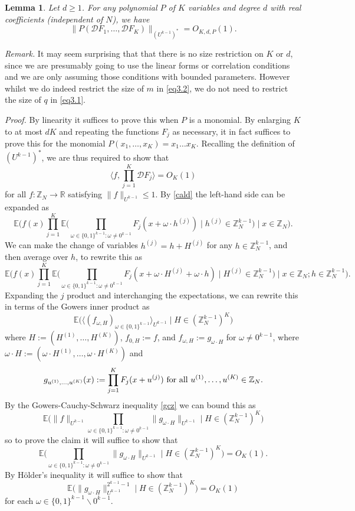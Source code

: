 \documentclass[12pt,a4paper,reqno]{amsart}
\numberwithin{equation}{section}
\theoremstyle{plain}
\newtheorem{lemma}[subsection]{Lemma}
\theoremstyle{definition}
\renewcommand{\leq}{\leqslant}
\renewcommand{\geq}{\geqslant}
\def\E{{\mathbb E}}
\def\R{{\mathbb R}}
\def\vs{\vspace{11pt}}
\def\proof{\noindent\textit{Proof. }}
\begin{document}
\begin{lemma}\label{poly-lemma} Let $d \geq 1$.  For any polynomial $P$ of $K$ variables and degree $d$ with real coefficients \textup{(}independent of $N$\textup{)}, we have
\[ \| P({\mathcal D} F_1, \ldots, {\mathcal D} F_K) \|_{(U^{k-1})^*} = O_{K,d,P}(1).\]
\end{lemma}

\noindent\textit{Remark.} It may seem surprising that that there is no size restriction on $K$ or $d$, since we are presumably going to use the linear forms or correlation conditions and we are only assuming those conditions with bounded parameters.  However whilst we do indeed restrict the size of $m$ in \eqref{eq3.2}, we do not need to restrict the size of $q$ in \eqref{eq3.1}.\vs

\proof  By linearity it suffices to prove this when $P$ is a monomial.
By enlarging $K$ to at most $dK$ and repeating the functions $F_j$ as necessary, it in fact suffices to prove this for the monomial $P(x_1,\ldots,x_K) = x_1 \ldots x_K$.
Recalling the definition of $(U^{k-1})^*$, we are thus required to show that
\[ \big\langle f, \prod_{j=1}^K {\mathcal D} F_j \big\rangle = O_K(1) \]
for all $f: \mathbb{Z}_N \to \R$ satisfying $\| f \|_{U^{k-1}} \leq 1$.  
By \eqref{cald} the left-hand side can be expanded as
\[
\E\bigg( f(x)
\prod_{j=1}^K \E\big( \prod_{\omega \in \{0,1\}^{k-1}: \omega \neq 0^{k-1}} F_j(x + \omega \cdot h^{(j)}) \;  \big| \;  h^{(j)} \in \mathbb{Z}_N^{k-1} \big) \; \bigg|\; x \in \mathbb{Z}_N\bigg).\]
We can make the change of variables $h^{(j)} = h + H^{(j)}$ for any $h \in \mathbb{Z}_N^{k-1}$, and then average over $h$,
to rewrite this as
\[
\E\bigg( f(x)
\prod_{j=1}^K \E\big( \prod_{\omega \in \{0,1\}^{k-1}: \omega \neq 0^{k-1}} F_j(x + \omega \cdot H^{(j)} + \omega \cdot h) \; \big| \; H^{(j)} \in \mathbb{Z}_N^{k-1} \big) \; \bigg| \; x \in \mathbb{Z}_N; h \in \mathbb{Z}_N^{k-1}\bigg).\]
Expanding the $j$ product and interchanging the expectations, we can rewrite this in terms of the Gowers inner product as
\[ \E\big( \langle (f_{\omega, H})_{\omega \in \{0,1\}^{k-1}} \rangle_{U^{k-1}} \; \big| \; H \in (\mathbb{Z}_N^{k-1})^K \big)\]
where $H := (H^{(1)}, \ldots, H^{(K)})$, $f_{0,H} := f$, and $f_{\omega,H} := g_{\omega \cdot H}$ for $\omega \neq 0^{k-1}$,
where $\omega \cdot H := (\omega \cdot H^{(1)}, \ldots, \omega \cdot H^{(K)})$ and
\begin{equation}\label{foh-def}
 g_{u^{(1)}, \ldots, u^{(K)}}(x) := \prod_{j=1}^K F_j(x + u^{(j)}) \hbox{ for all } u^{(1)}, \ldots, u^{(K)} \in \mathbb{Z}_N.
\end{equation}
By the Gowers-Cauchy-Schwarz inequality \eqref{gcz} we can bound this as
\[ \E\bigg( \| f\|_{U^{k-1}} \prod_{\omega \in \{0,1\}^{k-1}: \omega \neq 0^{k-1}} \| g_{\omega \cdot H} \|_{U^{k-1}}
\; \bigg| \; H \in (\mathbb{Z}_N^{k-1})^K \bigg)\]
so to prove the claim it will suffice to show that
\[ \E\bigg( \prod_{\omega \in \{0,1\}^{k-1}: \omega \neq 0^{k-1}} \| g_{\omega \cdot H} \|_{U^{k-1}} \; \bigg| \; H \in (\mathbb{Z}_N^{k-1})^K \bigg) = O_K(1).\]
By H\"older's inequality it will suffice to show that
$$\E\big( \| g_{\omega \cdot H} \|_{U^{k-1}}^{2^{k-1}-1} \; \big| \; H \in (\mathbb{Z}_N^{k-1})^K \big) = O_K(1)$$
for each $\omega \in \{0,1\}^{k-1} \backslash 0^{k-1}$.  \vs
\end{document}
